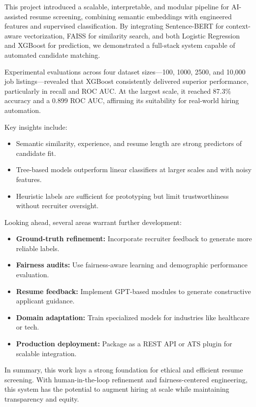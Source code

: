 \documentclass[a4paper]{article}
\begin{document}
\begin{multicols}{2}
This project introduced a scalable, interpretable, and modular pipeline for AI-assisted resume screening, combining semantic embeddings with engineered features and supervised classification. By integrating Sentence-BERT for context-aware vectorization, FAISS for similarity search, and both Logistic Regression and XGBoost for prediction, we demonstrated a full-stack system capable of automated candidate matching.

Experimental evaluations across four dataset sizes—100, 1000, 2500, and 10,000 job listings—revealed that XGBoost consistently delivered superior performance, particularly in recall and ROC AUC. At the largest scale, it reached 87.3\% accuracy and a 0.899 ROC AUC, affirming its suitability for real-world hiring automation.

Key insights include:
\begin{itemize}
    \item Semantic similarity, experience, and resume length are strong predictors of candidate fit.
    \item Tree-based models outperform linear classifiers at larger scales and with noisy features.
    \item Heuristic labels are sufficient for prototyping but limit trustworthiness without recruiter oversight.
\end{itemize}

Looking ahead, several areas warrant further development:
\begin{itemize}
    \item \textbf{Ground-truth refinement:} Incorporate recruiter feedback to generate more reliable labels.
    \item \textbf{Fairness audits:} Use fairness-aware learning and demographic performance evaluation.
    \item \textbf{Resume feedback:} Implement GPT-based modules to generate constructive applicant guidance.
    \item \textbf{Domain adaptation:} Train specialized models for industries like healthcare or tech.
    \item \textbf{Production deployment:} Package as a REST API or ATS plugin for scalable integration.
\end{itemize}

In summary, this work lays a strong foundation for ethical and efficient resume screening. With human-in-the-loop refinement and fairness-centered engineering, this system has the potential to augment hiring at scale while maintaining transparency and equity.




\end{multicols}
\end{document}
